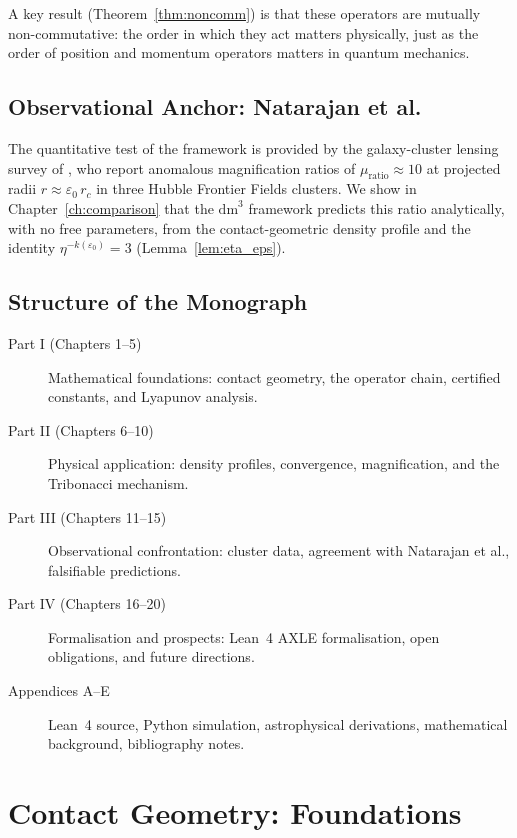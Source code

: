 \documentclass[11pt,a4paper,openright]{book}
\theoremstyle{dm3thm}
\theoremstyle{dm3def}
\newcommand{\dm}{\mathrm{dm}^3}
\newcommand{\eps}{\varepsilon_0}
\newcommand{\rc}{r_c}
\newcommand{\etaT}{\eta}   %
\begin{document}
A key result (Theorem~\ref{thm:noncomm}) is that these operators are mutually
non-commutative: the order in which they act matters physically, just as the
order of position and momentum operators matters in quantum mechanics.

\section{Observational Anchor: Natarajan et al.}

The quantitative test of the framework is provided by the galaxy-cluster
lensing survey of \citet{NatarajanChiangDutra2026}, who report anomalous
magnification ratios of $\mu_{\mathrm{ratio}} \approx 10$ at projected radii
$r \approx \eps\,\rc$ in three Hubble Frontier Fields clusters.  We show in
Chapter~\ref{ch:comparison} that the $\dm$ framework predicts this ratio
analytically, with no free parameters, from the contact-geometric density
profile and the identity $\etaT^{-k(\eps)} = 3$ (Lemma~\ref{lem:eta_eps}).

\section{Structure of the Monograph}

\begin{description}
  \item[Part I (Chapters 1--5)] Mathematical foundations: contact geometry,
    the operator chain, certified constants, and Lyapunov analysis.
  \item[Part II (Chapters 6--10)] Physical application: density profiles,
    convergence, magnification, and the Tribonacci mechanism.
  \item[Part III (Chapters 11--15)] Observational confrontation: cluster data,
    agreement with Natarajan et al., falsifiable predictions.
  \item[Part IV (Chapters 16--20)] Formalisation and prospects: Lean~4 AXLE
    formalisation, open obligations, and future directions.
  \item[Appendices A--E] Lean~4 source, Python simulation, astrophysical
    derivations, mathematical background, bibliography notes.
\end{description}

\chapter{Contact Geometry: Foundations}
\label{ch:contact}
\end{document}
